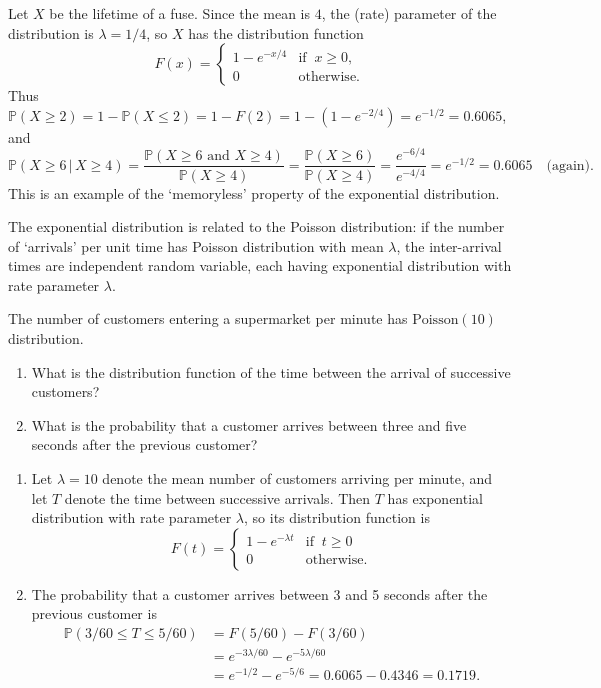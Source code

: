 \documentclass[lecture]{csm}
\newcommand{\prob}{\mathbb{P}}
\def\it{\item}
\def\ben{\begin{enumerate}}
\def\een{\end{enumerate}}
\begin{document}
\begin{solution}
Let $X$ be the lifetime of a fuse. Since the mean is $4$, the (rate) parameter of the distribution is $\lambda=1/4$, so $X$ has the distribution function 
\[
F(x) = \begin{cases}
	1 - e^{-x/4} 	& \text{if }\ x\geq 0, \\
	0				& \text{otherwise}.	
\end{cases}
\]
Thus $\prob(X\geq 2) = 1-\prob(X\leq 2) = 1-F(2) = 1 - (1 - e^{-2/4}) = e^{-1/2} = 0.6065$, and 
\[
\prob(X\geq 6\,|\,X\geq 4)
	= \frac{\prob(X\geq 6\text{ and } X\geq 4)}{\prob(X\geq 4)} 
	= \frac{\prob(X\geq 6)}{\prob(X\geq 4)}
	= \frac{e^{-6/4}}{e^{-4/4}} = e^{-1/2} = 0.6065 \quad\text{(again)}.
\]
This is an example of the `memoryless' property of the exponential distribution.
\end{solution}

The exponential distribution is related to the Poisson distribution: if the number of `arrivals' per unit time has Poisson distribution with mean $\lambda$, the inter-arrival times are independent random variable, each having exponential distribution with rate parameter $\lambda$. 

\begin{example}
The number of customers entering a supermarket per minute has $\text{Poisson}(10)$ distribution.%
\ben
\it What is the distribution function of the time between the arrival of successive customers?
\it What is the probability that a customer arrives between three and five seconds after the previous customer?
\een
\end{example}

\begin{solution}
\ben
\it %
Let $\lambda=10$ denote the mean number of customers arriving per minute, and let $T$ denote the time between successive arrivals. Then $T$ has exponential distribution with rate parameter $\lambda$, so its distribution function is
\[
F(t) = \begin{cases}
	1 - e^{-\lambda t}	& \text{if }\ t \geq 0 \\
	0					& \text{otherwise.}
\end{cases}
\]
\it %
The probability that a customer arrives between 3 and 5 seconds after the previous customer is
\begin{align*}
\prob(3/60\leq T\leq 5/60) 
	& = F(5/60) - F(3/60) \\
	& = e^{-3\lambda/60} - e^{-5\lambda/60} \\
	& = e^{-1/2} - e^{-5/6} = 0.6065 - 0.4346 = 0.1719.
\end{align*}
\een
\end{solution}
\end{document}
